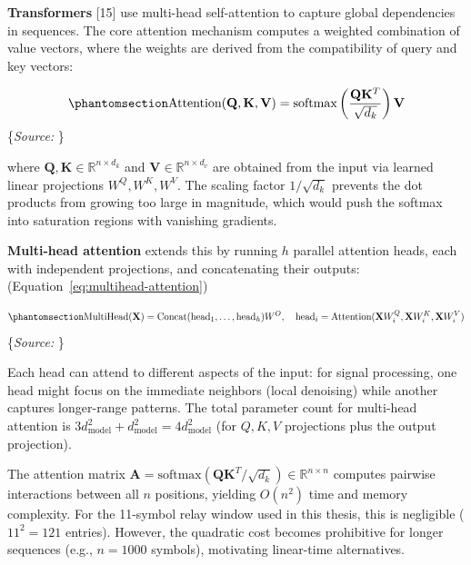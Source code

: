 \documentclass[
  english,
  12pt,
  12pt,
  a4paper,
  oneside]{report}
\begin{document}
\textbf{Transformers} {[}15{]} use multi-head self-attention to capture global dependencies in sequences. The core attention mechanism computes a weighted combination of value vectors, where the weights are derived from the compatibility of query and key vectors:

\begin{equation}\protect\phantomsection\label{eq:attention}{\text{Attention}(\mathbf{Q}, \mathbf{K}, \mathbf{V}) = \text{softmax}\left(\frac{\mathbf{Q}\mathbf{K}^T}{\sqrt{d_k}}\right)\mathbf{V}
}\end{equation} \footnotesize\{\textit{Source: \1}\}\normalsize

where \(\mathbf{Q}, \mathbf{K} \in \mathbb{R}^{n \times d_k}\) and \(\mathbf{V} \in \mathbb{R}^{n \times d_v}\) are obtained from the input via learned linear projections \(W^Q, W^K, W^V\). The scaling factor \(1/\sqrt{d_k}\) prevents the dot products from growing too large in magnitude, which would push the softmax into saturation regions with vanishing gradients.

\textbf{Multi-head attention} extends this by running \(h\) parallel attention heads, each with independent projections, and concatenating their outputs: (Equation~\ref{eq:multihead-attention})

\begin{equation}\protect\phantomsection\label{eq:multihead-attention}{\text{MultiHead}(\mathbf{X}) = \text{Concat}(\text{head}_1, \dots, \text{head}_h) W^O, \quad \text{head}_i = \text{Attention}(\mathbf{X} W_i^Q, \mathbf{X} W_i^K, \mathbf{X} W_i^V)
}\end{equation} \footnotesize\{\textit{Source: \1}\}\normalsize

Each head can attend to different aspects of the input: for signal processing, one head might focus on the immediate neighbors (local denoising) while another captures longer-range patterns. The total parameter count for multi-head attention is \(3 d_{\text{model}}^2 + d_{\text{model}}^2 = 4 d_{\text{model}}^2\) (for \(Q, K, V\) projections plus the output projection).

The attention matrix \(\mathbf{A} = \text{softmax}(\mathbf{Q}\mathbf{K}^T / \sqrt{d_k}) \in \mathbb{R}^{n \times n}\) computes pairwise interactions between all \(n\) positions, yielding \(O(n^2)\) time and memory complexity. For the 11-symbol relay window used in this thesis, this is negligible (\(11^2 = 121\) entries). However, the quadratic cost becomes prohibitive for longer sequences (e.g., \(n = 1000\) symbols), motivating linear-time alternatives.
\end{document}

